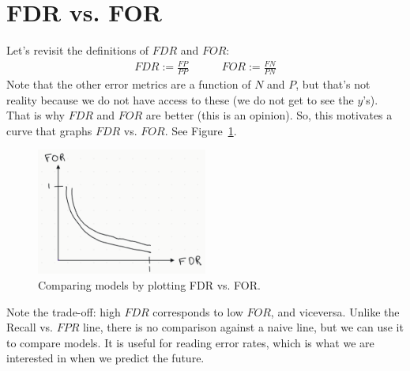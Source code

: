 \documentclass[12pt, a4paper]{article}
\theoremstyle{definition}
\begin{document}
	\section{FDR vs. FOR}
	Let's revisit the definitions of $FDR$ and $FOR$:
	\begin{align*}
		FDR := \frac{FP}{PP} \quad\quad\quad FOR := \frac{FN}{PN}
	\end{align*}
	Note that the other error metrics are a function of $N$ and $P$,
	but that's not reality because we do not have access to these
	(we do not get to see the $y$'s). That is why $FDR$ and $FOR$
	are better (this is an opinion). So, this motivates a curve that graphs
	$FDR$ vs. $FOR$. See Figure~\ref{fig:fdr-vs-for}.
	\begin{figure}
		\centering
		\includegraphics[width=0.5\textwidth]{fdr-vs-for}
		\caption{Comparing models by plotting FDR vs. FOR.}
		\label{fig:fdr-vs-for}
	\end{figure}
	Note the trade-off: high $FDR$ corresponds to low $FOR$, and viceversa.
	Unlike the Recall vs. $FPR$ line, there is no comparison against a
	naive line, but we can use it to compare models. It is useful for
	reading error rates, which is what we are interested in when we predict
	the future.
\end{document}
